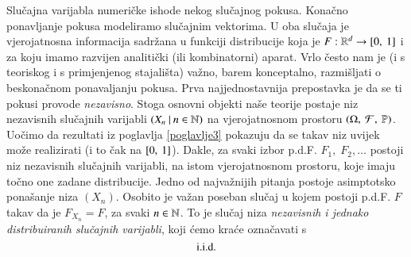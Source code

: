 \begin{nap} \label{nap:9.12}
    Slu\v cajna varijabla numeri\v cke ishode nekog slu\v cajnog pokusa.
    Kona\v cno ponavljanje pokusa modeliramo slu\v cajnim vektorima.
    U oba slu\v caja je vjerojatnosna informacija sadr\v zana u funkciji distribucije koja je $F: \mathbb{R}^d \to [{0}, \:{1}]$ i za koju imamo razvijen analiti\v cki (ili kombinatorni) aparat.
    Vrlo \v cesto nam je (i s teoriskog i s primjenjenog stajali\v sta) va\v zno, barem konceptalno, razmi\v sljati o beskona\v cnom ponavaljanju pokusa.
    Prva najjednostavnija prepostavka je da se ti pokusi provode \emph{nezavisno}.
    Stoga osnovni objekti na\v se teorije postaje niz nezavisnih slu\v cajnih varijabli $({X_n} \: | \: {n \in \mathbb{N}})$ na vjerojatnosnom prostoru $(\Omega, \: \mathcal{F}, \: \mathbb{P})$.
    Uo\v cimo da rezultati iz poglavlja \ref{poglavlje3} pokazuju da se takav niz uvijek mo\v ze realizirati (i to \v cak na $[{0}, \:{1}]$).
    Dakle, za svaki izbor p.d.F. $F_1, \; F_2, \ldots$ postoji niz nezavisnih slu\v cajnih varijabli, na istom vjerojatnosnom prostoru, koje imaju to\v cno one zadane distribucije.
    Jedno od najva\v znijih pitanja postoje asimptotsko pona\v sanje niza $(X_n)$.
    Osobito je va\v zan poseban slu\v caj u kojem postoji p.d.F. $F$ takav da je $F_{X_n} = F$, za svaki $n \in \mathbb{N}$.
    To je slu\v caj niza \emph{nezavisnih i jednako distribuiranih slu\v cajnih varijabli}, koji \' cemo kra\' ce ozna\v cavati s
    \begin{equation*}
        \mathrm{i.i.d.}
    \end{equation*}
\end{nap}